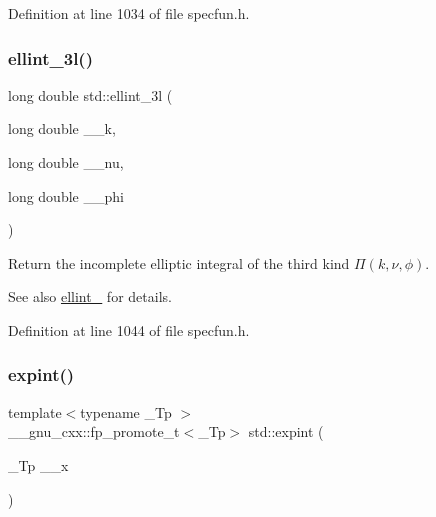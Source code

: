 Definition at line 1034 of file specfun.\+h.

\mbox{\label{group__cxx17__math__spec__func_gaa8c0e5864df8769021a7f3e21a30c5d2}} 
\subsubsection{\texorpdfstring{ellint\+\_\+3l()}{ellint\_3l()}}
{\footnotesize\ttfamily long double std\+::ellint\+\_\+3l (\begin{DoxyParamCaption}\item[{long double}]{\+\_\+\+\_\+k,  }\item[{long double}]{\+\_\+\+\_\+nu,  }\item[{long double}]{\+\_\+\+\_\+phi }\end{DoxyParamCaption})\hspace{0.3cm}{\ttfamily [inline]}}



Return the incomplete elliptic integral of the third kind $ \Pi(k,\nu,\phi) $. 

\begin{DoxySeeAlso}{See also}
\hyperlink{group__cxx17__math__spec__func_gaac0240d1e7e401e652b9d1adf4c7e029}{ellint\+\_} for details. 
\end{DoxySeeAlso}


Definition at line 1044 of file specfun.\+h.

\mbox{\label{group__cxx17__math__spec__func_ga0e9ac717a106ef54184b5f058c451782}} 
\subsubsection{\texorpdfstring{expint()}{expint()}}
{\footnotesize\ttfamily template$<$typename \+\_\+\+Tp $>$ \\
\+\_\+\+\_\+gnu\+\_\+cxx\+::fp\+\_\+promote\+\_\+t$<$\+\_\+\+Tp$>$ std\+::expint (\begin{DoxyParamCaption}\item[{\+\_\+\+Tp}]{\+\_\+\+\_\+x }\end{DoxyParamCaption})\hspace{0.3cm}{\ttfamily [inline]}}

